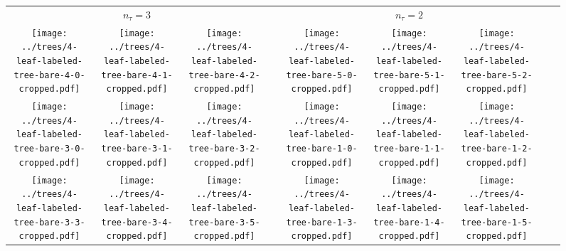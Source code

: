 \documentclass[border=10pt,varwidth=30cm]{standalone}
\newcommand{\ndivs}{\ensuremath{n_{\tau}}\xspace}
\newcommand{\pltwidth}{0.1}
\newcommand{\catspace}{0.02}
\begin{document}
\begin{figure}
    \setlength\arrayrulewidth{2pt}
    \centering
    \begin{tabular}{@{}ccccccccc@{}}
        \multicolumn{3}{c}{\LARGE $\ndivs = 3$} & & \multicolumn{3}{c}{\LARGE $\ndivs = 2$} & & { } \\[1ex]
        \texttt{[image: ../trees/4-leaf-labeled-tree-bare-4-0-cropped.pdf]}
        &
        \texttt{[image: ../trees/4-leaf-labeled-tree-bare-4-1-cropped.pdf]}
        &
        \texttt{[image: ../trees/4-leaf-labeled-tree-bare-4-2-cropped.pdf]}
        &
        \hspace{\catspace\textwidth}
        &
        \texttt{[image: ../trees/4-leaf-labeled-tree-bare-5-0-cropped.pdf]}
        &
        \texttt{[image: ../trees/4-leaf-labeled-tree-bare-5-1-cropped.pdf]}
        &
        \texttt{[image: ../trees/4-leaf-labeled-tree-bare-5-2-cropped.pdf]}
        &
        \hspace{\catspace\textwidth}
        &
        \\
        \texttt{[image: ../trees/4-leaf-labeled-tree-bare-3-0-cropped.pdf]}
        &
        \texttt{[image: ../trees/4-leaf-labeled-tree-bare-3-1-cropped.pdf]}
        &
        \texttt{[image: ../trees/4-leaf-labeled-tree-bare-3-2-cropped.pdf]}
        &
        &
        \texttt{[image: ../trees/4-leaf-labeled-tree-bare-1-0-cropped.pdf]}
        &
        \texttt{[image: ../trees/4-leaf-labeled-tree-bare-1-1-cropped.pdf]}
        &
        \texttt{[image: ../trees/4-leaf-labeled-tree-bare-1-2-cropped.pdf]}
        &
        &
        \\
        \texttt{[image: ../trees/4-leaf-labeled-tree-bare-3-3-cropped.pdf]}
        &
        \texttt{[image: ../trees/4-leaf-labeled-tree-bare-3-4-cropped.pdf]}
        &
        \texttt{[image: ../trees/4-leaf-labeled-tree-bare-3-5-cropped.pdf]}
        &
        &
        \texttt{[image: ../trees/4-leaf-labeled-tree-bare-1-3-cropped.pdf]}
        &
        \texttt{[image: ../trees/4-leaf-labeled-tree-bare-1-4-cropped.pdf]}
        &
        \texttt{[image: ../trees/4-leaf-labeled-tree-bare-1-5-cropped.pdf]}

\end{tabular}
\end{figure}
\end{document}

